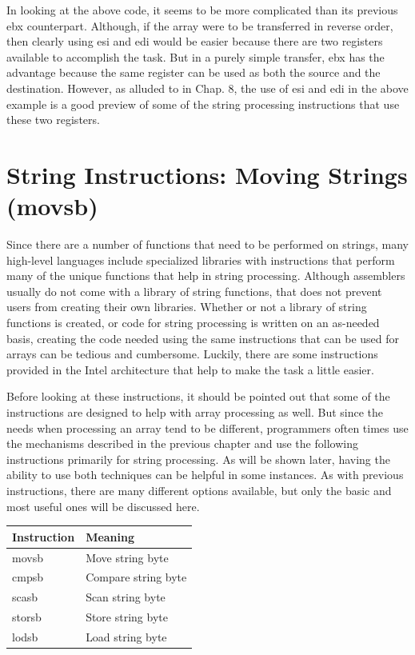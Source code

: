 \documentclass[10pt]{book}
\begin{document}
In looking at the above code, it seems to be more complicated than its previous ebx counterpart. Although, if the array were to be transferred in reverse order, then clearly using esi and edi would be easier because there are two registers available to accomplish the task. But in a purely simple transfer, ebx has the advantage because the same register can be used as both the source and the destination. However, as alluded to in Chap. 8, the use of esi and edi in the above example is a good preview of some of the string processing instructions that use these two registers.


\section{String Instructions: Moving Strings (movsb)}
Since there are a number of functions that need to be performed on strings, many high-level languages include specialized libraries with instructions that perform many of the unique functions that help in string processing. Although assemblers usually do not come with a library of string functions, that does not prevent users from creating their own libraries. Whether or not a library of string functions is created, or code for string processing is written on an as-needed basis, creating the code needed using the same instructions that can be used for arrays can be tedious and cumbersome. Luckily, there are some instructions provided in the Intel architecture that help to make the task a little easier.

Before looking at these instructions, it should be pointed out that some of the instructions are designed to help with array processing as well. But since the needs when processing an array tend to be different, programmers often times use the mechanisms described in the previous chapter and use the following instructions primarily for string processing. As will be shown later, having the ability to use both techniques can be helpful in some instances. As with previous instructions, there are many different options available, but only the basic and most useful ones will be discussed here.

\begin{center}
\begin{tabular}{|l|l|}
\hline
Instruction & Meaning \\
\hline
movsb & Move string byte \\
\hline
cmpsb & Compare string byte \\
\hline
scasb & Scan string byte \\
\hline
storsb & Store string byte \\
\hline
lodsb & Load string byte \\
\hline
\end{tabular}
\end{center}
\end{document}
